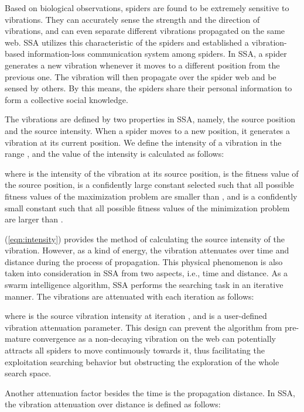 \documentclass[conference]{IEEEtran}
\begin{document}
Based on biological observations, spiders are found to be extremely sensitive to vibrations. They can accurately sense the strength and the direction of vibrations, and can even separate different vibrations propagated on the same web\cite{Uetz1992Foragingstrategiesspiders}. SSA utilizes this characteristic of the spiders and established a vibration-based information-loss communication system among spiders. In SSA, a spider generates a new vibration whenever it moves to a different position from the previous one. The vibration will then propagate over the spider web and be sensed by others. By this means, the spiders share their personal information to form a collective social knowledge.

The vibrations are defined by two properties in SSA, namely, the source position and the source intensity. When a spider moves to a new position, it generates a vibration at its current position. We define the intensity of a vibration in the range , and the value of the intensity is calculated as follows:

where  is the intensity of the vibration at its source position,  is the fitness value of the source position,  is a confidently large constant selected such that all possible fitness values of the maximization problem are smaller than , and  is a confidently small constant such that all possible fitness values of the minimization problem are larger than .

(\ref{eqn:intensity}) provides the method of calculating the source intensity of the vibration. However, as a kind of energy, the vibration attenuates over time and distance during the process of propagation. This physical phenomenon is also taken into consideration in SSA from two aspects, i.e., time and distance. As a swarm intelligence algorithm, SSA performs the searching task in an iterative manner. The vibrations are attenuated with each iteration as follows:
 
where  is the source vibration intensity at iteration , and  is a user-defined vibration attenuation parameter. This design can prevent the algorithm from pre-mature convergence as a non-decaying vibration on the web can potentially attracts all spiders to move continuously towards it, thus facilitating the exploitation searching behavior but obstructing the exploration of the whole search space.

Another attenuation factor besides the time is the propagation distance. In SSA, the vibration attenuation over distance is defined as follows:
\end{document}

